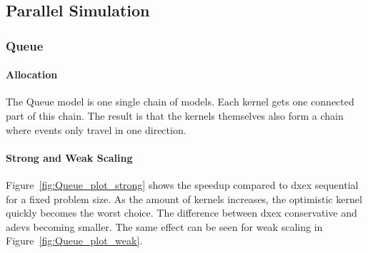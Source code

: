 \subsection{Parallel Simulation}

\subsubsection{Queue}
\paragraph*{Allocation}
The Queue model is one single chain of models. Each kernel gets one connected part of this chain. The result is that the kernels themselves also form a chain where events only travel in one direction.

\paragraph*{Strong and Weak Scaling}
Figure~\ref{fig:Queue_plot_strong} shows the speedup compared to dxex sequential for a fixed problem size.
As the amount of kernels increases, the optimistic kernel quickly becomes the worst choice.
The difference between dxex conservative and adevs becoming smaller.
The same effect can be seen for weak scaling in Figure~\ref{fig:Queue_plot_weak}.

